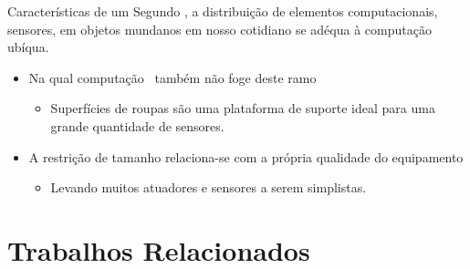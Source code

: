 \begin{frame}{Características de um \Wearable} \vspace{-1em}
Segundo \cite{VanLaerhoven2002}, a distribuição de elementos computacionais, sensores, em objetos mundanos em nosso cotidiano se adéqua à computação ubíqua. 
\begin{itemize}
\setlength{\itemsep}{1.5em}
\item Na qual computação \wearable\ também não foge deste ramo
\begin{itemize}
   \item Superfícies de roupas são uma plataforma de suporte ideal para uma grande quantidade de sensores.
\end{itemize}
\item A restrição de tamanho relaciona-se com a própria qualidade do equipamento
\begin{itemize}
   \item Levando muitos atuadores e sensores a serem simplistas.
\end{itemize}
\end{itemize}
\end{frame}

\section{Trabalhos Relacionados}

